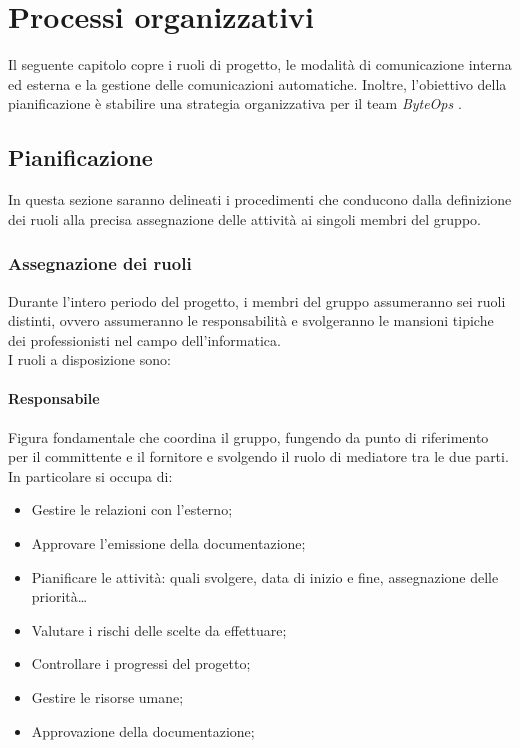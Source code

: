 \documentclass{article}
\begin{document}
\section{Processi organizzativi}
Il seguente capitolo copre i ruoli di progetto, le modalità di comunicazione interna ed esterna e la gestione delle comunicazioni automatiche. Inoltre, l'obiettivo della pianificazione è stabilire una strategia organizzativa per il team \textit{ByteOps} .   
    \subsection{Pianificazione}
    In questa sezione saranno delineati i procedimenti che conducono dalla definizione dei ruoli alla precisa assegnazione delle attività ai singoli membri del gruppo.
    \subsubsection{Assegnazione dei ruoli}

    Durante l'intero periodo del progetto, i membri del gruppo assumeranno sei ruoli distinti, ovvero assumeranno le responsabilità e svolgeranno le mansioni tipiche dei professionisti nel campo dell'informatica.
    \\I ruoli a disposizione sono:
        \paragraph{Responsabile}\label{responsabile} Figura fondamentale che coordina il gruppo, fungendo da punto di riferimento per il committente e il fornitore e svolgendo il ruolo di mediatore tra le due parti.\\
        In particolare si occupa di:
        \begin{itemize}
            \item Gestire le relazioni con l'esterno;
            \item Approvare l'emissione della documentazione;
            \item Pianificare le attività: quali svolgere, data di inizio e fine, assegnazione delle priorità\dots
            \item Valutare i rischi delle scelte da effettuare;
            \item Controllare i progressi del progetto;
            \item Gestire le risorse umane;
            \item Approvazione della documentazione;
        \end{itemize}
\end{document}
